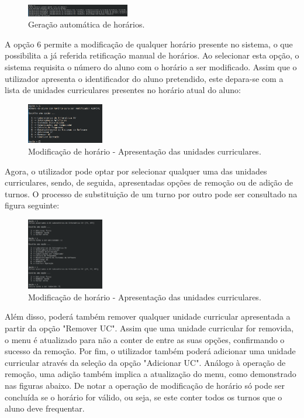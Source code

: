 \documentclass[12pt, a4paper]{article}
\begin{document}
\begin{figure}[H]
    \centering
    \includegraphics[width=0.4\textwidth]{Imagens/Manual/DiretorCurso-5.png}
    \caption{Geração automática de horários.}
\end{figure}

A opção 6 permite a modificação de qualquer horário presente no sistema, o que possibilita a já
referida retificação manual de horários. Ao selecionar esta opção, o sistema requisita o número do
aluno com o horário a ser modificado. Assim que o utilizador apresenta o identificador do aluno
pretendido, este depara-se com a lista de unidades curriculares presentes no horário atual do aluno:
\\

\begin{figure}[H]
    \centering
    \includegraphics[width=0.3\textwidth]{Imagens/Manual/DiretorCurso-6.png}
    \caption{Modificação de horário - Apresentação das unidades curriculares.}
\end{figure}

Agora, o utilizador pode optar por selecionar qualquer uma das unidades curriculares, sendo, de
seguida, apresentadas opções de remoção ou de adição de turnos. O processo de substituição de um
turno por outro pode ser consultado na figura seguinte: \\

\begin{figure}[H]
    \centering
    \includegraphics[width=0.3\textwidth]{Imagens/Manual/DiretorCurso-6-1.png}
    \caption{Modificação de horário - Apresentação das unidades curriculares.}
\end{figure}

Além disso, poderá também remover qualquer unidade curricular apresentada a partir da opção
"Remover UC". Assim que uma unidade curricular for removida, o menu é atualizado para não a conter
de entre as suas opções, confirmando o sucesso da remoção. Por fim, o utilizador também poderá
adicionar uma unidade curricular através da seleção da opção "Adicionar UC". Análogo à operação de
remoção, uma adição também implica a atualização do menu, como demonstrado nas figuras abaixo.
De notar a operação de modificação de horário só pode ser concluída se o horário for válido, ou
seja, se este conter todos os turnos que o aluno deve frequentar. \\
\end{document}
